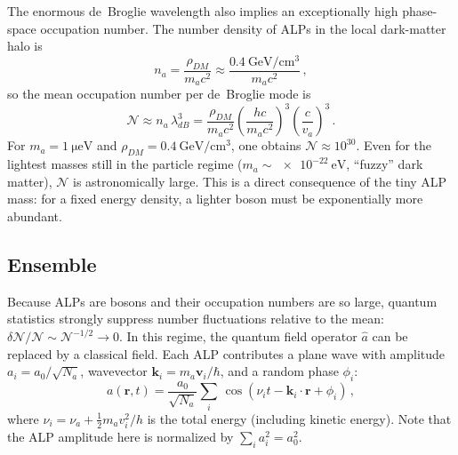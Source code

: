 The enormous de~Broglie wavelength also implies an exceptionally high phase-space occupation number. The number density of ALPs in the local dark-matter halo is
\begin{equation}
    n_a = \frac{\rho_{DM}}{m_a c^2}
    \approx \frac{\SI{0.4}{\GeV\per\cm^3}}{m_a c^2}
    \,,\label{eq:na}
\end{equation}
so the mean occupation number per de~Broglie mode is
\begin{equation}
    \mathcal{N} \approx n_a\,\lambda_{dB}^3
    = \frac{\rho_{DM}}{m_a c^2}\left(\frac{hc}{m_a c^2}\right)^3\!\left(\frac{c}{v_a}\right)^3
    \,.\label{eq:occupation}
\end{equation}
For $m_a = \SI{1}{\micro\eV}$ and $\rho_{DM} = \SI{0.4}{\GeV\per\cm^3}$, one obtains $\mathcal{N} \approx 10^{30}$. Even for the lightest masses still in the particle regime ($m_a \sim \SI{e-22}{\eV}$, ``fuzzy'' dark matter), $\mathcal{N}$ is astronomically large. This is a direct consequence of the tiny ALP mass: for a fixed energy density, a lighter boson must be exponentially more abundant.

\subsection{Ensemble}\label{sec:theory:classicallimit}

Because ALPs are bosons and their occupation numbers are so large, quantum statistics strongly suppress number fluctuations relative to the mean: $\delta\mathcal{N}/\mathcal{N} \sim \mathcal{N}^{-1/2} \to 0$. 
In this regime, the quantum field operator $\hat{a}$ can be replaced by a classical field. 
Each ALP contributes a plane wave with amplitude $a_i = a_0 / \sqrt{N_a}$, wavevector $\mathbf{k}_i = m_a \mathbf{v}_i/\hbar$, and a random phase $\phi_i$:
\begin{equation}
    a(\mathbf{r}, t)
    = \dfrac{a_0}{\sqrt{N_a}} \sum_i \, \cos\left(\nu_i t - \mathbf{k}_i\cdot\mathbf{r} + \phi_i\right)
    \,,\label{eq:ALP_sum}
\end{equation}
where $\nu_i = \nu_a + \tfrac{1}{2}m_a v_i^2/h $ is the total energy (including kinetic energy). 
Note that the ALP amplitude here is normalized by $\sum_i a_i^2 = a_0^2$. 

